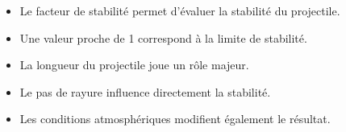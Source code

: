 \begin{aretenir}

\begin{itemize}
    \item Le facteur de stabilité permet d'évaluer la stabilité du
          projectile.
    \item Une valeur proche de 1 correspond à la limite de stabilité.
    \item La longueur du projectile joue un rôle majeur.
    \item Le pas de rayure influence directement la stabilité.
    \item Les conditions atmosphériques modifient également le résultat.
\end{itemize}

\end{aretenir}
